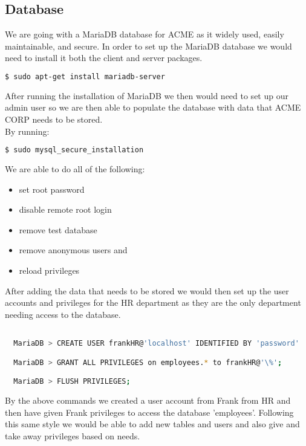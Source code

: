 
\subsection{Database}
We are going with a MariaDB database for ACME as it widely used, easily 
maintainable, and secure. In order to set up the MariaDB database we would
need to install it both the client and server packages.

\begin{lstlisting}[language=bash] 
  $ sudo apt-get install mariadb-server
\end{lstlisting}

\noindent After running the installation of MariaDB we then would need to set 
up our admin user so we are then able to populate the database with data that 
ACME CORP needs to be stored. \\

\noindent By running:

\begin{lstlisting}[language=bash] 
  $ sudo mysql_secure_installation
\end{lstlisting}

\vspace{.5em}

\noindent We are able to do all of the following: 

\begin{itemize}
\item set root password
\item disable remote root login
\item remove test database
\item remove anonymous users and
\item reload privileges
\end{itemize}

\noindent After adding the data that needs to be stored we would then set up 
the user accounts and privileges for the HR department as they are the only 
department needing access to the database.

\begin{lstlisting}[language=bash]

  MariaDB > CREATE USER frankHR@'localhost' IDENTIFIED BY 'password'

  MariaDB > GRANT ALL PRIVILEGES on employees.* to frankHR@'\%';

  MariaDB > FLUSH PRIVILEGES; 
\end{lstlisting}

\vspace{.5em}

\noindent By the above commands we created a user account from Frank from HR 
and then have given Frank privileges to access the database 'employees'. 
Following this same style we would be able to add new tables and users and also
 give and take away privileges based on needs.


